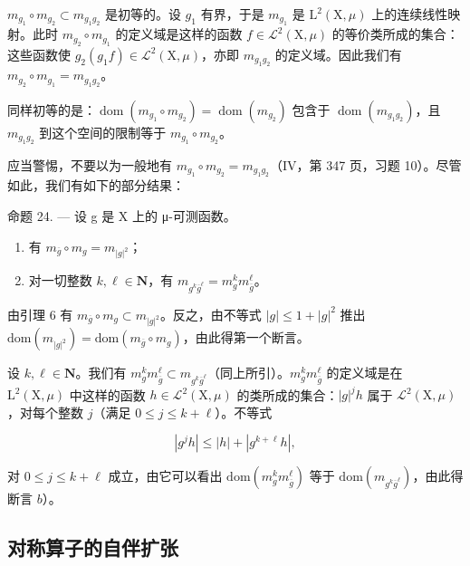 \(m_{g_{1}} \circ m_{g_{2}} \subset m_{g_{1}g_{2}}\) 是初等的。设 \(g_{1}\) 有界，于是 \(m_{g_{1}}\) 是 \(\mathrm{L}^{2}(\mathrm{X},\mu)\) 上的连续线性映射。此时 \(m_{g_{2}} \circ m_{g_{1}}\) 的定义域是这样的函数 \(f \in \mathcal{L}^{2}(\mathrm{X},\mu)\) 的等价类所成的集合：这些函数使 \(g_{2}(g_{1}f) \in \mathcal{L}^{2}(\mathrm{X},\mu)\)，亦即 \(m_{g_{1}g_{2}}\) 的定义域。因此我们有 \(m_{g_{2}} \circ m_{g_{1}} = m_{g_{1}g_{2}}\)。

同样初等的是：\(\operatorname{dom}(m_{g_{1}} \circ m_{g_{2}}) = \operatorname{dom}(m_{g_{2}})\) 包含于 \(\operatorname{dom}(m_{g_{1}g_{2}})\)，且 \(m_{g_{1}g_{2}}\) 到这个空间的限制等于 \(m_{g_{1}} \circ m_{g_{2}}\)。

应当警惕，不要以为一般地有 \(m_{g_{1}} \circ m_{g_{2}} = m_{g_{1}g_{2}}\)（IV，第 347 页，习题 10）。尽管如此，我们有如下的部分结果：

命题 24. --- 设 g 是 X 上的 μ-可测函数。

\begin{enumerate}
\def\labelenumi{\alph{enumi})}
\item
  有 \(m_{\overline{g}} \circ m_g = m_{|g|^2}\)；
\item
  对一切整数 \(k, \ell \in \mathbf{N}\)，有 \(m_{g^k\overline{g}^\ell} = m_g^k m_{\overline{g}}^\ell\)。
\end{enumerate}

由引理 6 有 \(m_{\overline{g}} \circ m_g \subset m_{|g|^2}\)。反之，由不等式 \(|g| \leqslant 1 + |g|^2\) 推出 \(\text{dom}(m_{|g|^2}) = \text{dom}(m_{\overline{g}} \circ m_g)\)，由此得第一个断言。

设 \(k, \ell \in \mathbf{N}\)。我们有 \(m_g^k m_{\overline{g}}^\ell \subset m_{g^k \overline{g}^\ell}\)（同上所引）。\(m_g^k m_{\overline{g}}^\ell\) 的定义域是在 \(\mathrm{L}^2(\mathrm{X}, \mu)\) 中这样的函数 \(h \in \mathcal{L}^2(\mathrm{X}, \mu)\) 的类所成的集合：\(|g|^j h\) 属于 \(\mathcal{L}^2(\mathrm{X}, \mu)\)，对每个整数 \(j\)（满足 \(0 \leqslant j \leqslant k + \ell\)）。不等式

\[
\left| g ^ {j} h \right| \leqslant | h | + \left| g ^ {k + \ell} h \right|,
\]

对 \(0 \leqslant j \leqslant k + \ell\) 成立，由它可以看出 \(\mathrm{dom}(m_g^k m_{\overline{g}}^\ell)\) 等于 \(\mathrm{dom}(m_{g^k\overline{g}^\ell})\)，由此得断言 \(b\)）。

\subsection{对称算子的自伴扩张}


